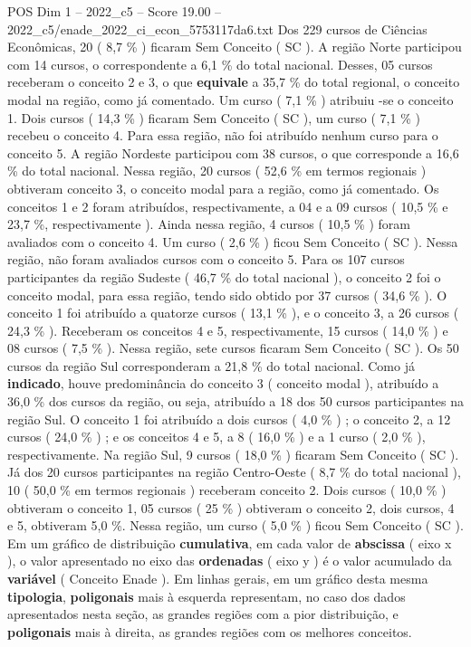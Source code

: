 \begin{textsample}{POS Dim 1 – 2022\_c5 – Score 19.00 – 2022\_c5/enade\_2022\_ci\_econ\_5753117da6.txt}
Dos 229 cursos de Ciências Econômicas, 20 ( 8,7 \% ) ficaram Sem Conceito ( SC ).
A região Norte participou com 14 cursos, o correspondente a 6,1 \% do total nacional.
Desses, 05 cursos receberam o conceito 2 e 3, o que \textbf{equivale} a 35,7 \% do total regional, o conceito modal na região, como já comentado.
Um curso ( 7,1 \% ) atribuiu -se o conceito 1.
Dois cursos ( 14,3 \% ) ficaram Sem Conceito ( SC ), um curso ( 7,1 \% ) recebeu o conceito 4.
Para essa região, não foi atribuído nenhum curso para o conceito 5.
A região Nordeste participou com 38 cursos, o que corresponde a 16,6 \% do total nacional.
Nessa região, 20 cursos ( 52,6 \% em termos regionais ) obtiveram conceito 3, o conceito modal para a região, como já comentado.
Os conceitos 1 e 2 foram atribuídos, respectivamente, a 04 e a 09 cursos ( 10,5 \% e 23,7 \%, respectivamente ).
Ainda nessa região, 4 cursos ( 10,5 \% ) foram avaliados com o conceito 4.
Um curso ( 2,6 \% ) ficou Sem Conceito ( SC ).
Nessa região, não foram avaliados cursos com o conceito 5.
Para os 107 cursos participantes da região Sudeste ( 46,7 \% do total nacional ), o conceito 2 foi o conceito modal, para essa região, tendo sido obtido por 37 cursos ( 34,6 \% ).
O conceito 1 foi atribuído a quatorze cursos ( 13,1 \% ), e o conceito 3, a 26 cursos ( 24,3 \% ).
Receberam os conceitos 4 e 5, respectivamente, 15 cursos ( 14,0 \% ) e 08 cursos ( 7,5 \% ).
Nessa região, sete cursos ficaram Sem Conceito ( SC ).
Os 50 cursos da região Sul corresponderam a 21,8 \% do total nacional.
Como já \textbf{indicado}, houve predominância do conceito 3 ( conceito modal ), atribuído a 36,0 \% dos cursos da região, ou seja, atribuído a 18 dos 50 cursos participantes na região Sul.
O conceito 1 foi atribuído a dois cursos ( 4,0 \% ) ; o conceito 2, a 12 cursos ( 24,0 \% ) ; e os conceitos 4 e 5, a 8 ( 16,0 \% ) e a 1 curso ( 2,0 \% ), respectivamente.
Na região Sul, 9 cursos ( 18,0 \% ) ficaram Sem Conceito ( SC ).
Já dos 20 cursos participantes na região Centro-Oeste ( 8,7 \% do total nacional ), 10 ( 50,0 \% em termos regionais ) receberam conceito 2.
Dois cursos ( 10,0 \% ) obtiveram o conceito 1, 05 cursos ( 25 \% ) obtiveram o conceito 2, dois cursos, 4 e 5, obtiveram 5,0 \%.
Nessa região, um curso ( 5,0 \% ) ficou Sem Conceito ( SC ).
Em um gráfico de distribuição \textbf{cumulativa}, em cada valor de \textbf{abscissa} ( eixo x ), o valor apresentado no eixo das \textbf{ordenadas} ( eixo y ) é o valor acumulado da \textbf{variável} ( Conceito Enade ).
Em linhas gerais, em um gráfico desta mesma \textbf{tipologia}, \textbf{poligonais} mais à esquerda representam, no caso dos dados apresentados nesta seção, as grandes regiões com a pior distribuição, e \textbf{poligonais} mais à direita, as grandes regiões com os melhores conceitos.

\end{textsample}
